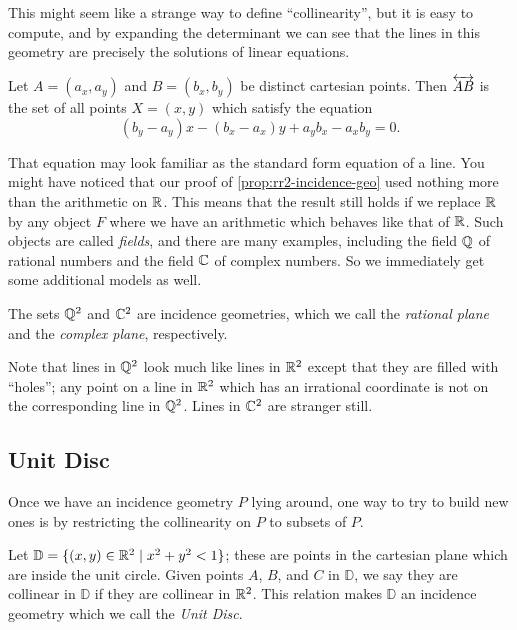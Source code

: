 This might seem like a strange way to define ``collinearity'', but it is easy to compute, and by expanding the determinant we can see that the lines in this geometry are precisely the solutions of linear equations.

\begin{cor}[Lines in \(\RR^2\)] \label{cor:cartesian-lines}
Let \(A = (a_x, a_y)\) and \(B = (b_x, b_y)\) be distinct cartesian points.
Then \(\overleftrightarrow{AB}\) is the set of all points \(X = (x,y)\) which satisfy the equation \[ (b_y-a_y)x - (b_x-a_x)y + a_yb_x - a_xb_y = 0. \]
\end{cor}

That equation may look familiar as the standard form equation of a line.
You might have noticed that our proof of \ref{prop:rr2-incidence-geo} used nothing more than the arithmetic on \(\mathbb{R}\).
This means that the result still holds if we replace \(\mathbb{R}\) by any object \(F\) where we have an arithmetic which behaves like that of \(\mathbb{R}\).
Such objects are called \emph{fields}, and there are many examples, including the field \(\mathbb{Q}\) of rational numbers and the field \(\mathbb{C}\) of complex numbers.
So we immediately get some additional models as well.

\begin{cor}
The sets \(\mathbb{Q}^2\) and \(\mathbb{C}^2\) are incidence geometries, which we call the \emph{rational plane} and the \emph{complex plane}, respectively.
\end{cor}

Note that lines in \(\mathbb{Q}^2\) look much like lines in \(\RR^2\) except that they are filled with ``holes''; any point on a line in \(\RR^2\) which has an irrational coordinate is not on the corresponding line in \(\mathbb{Q}^2\).
Lines in \(\mathbb{C}^2\) are stranger still.


\subsection{Unit Disc}

Once we have an incidence geometry \(P\) lying around, one way to try to build new ones is by restricting the collinearity on \(P\) to subsets of \(P\).

\begin{prop}
Let \(\mathbb{D} = \{ (x,y) \in \mathbb{R}^2 \mid x^2 + y^2 < 1 \}\); these are points in the cartesian plane which are inside the unit circle.
Given points \(A\), \(B\), and \(C\) in \(\mathbb{D}\), we say they are collinear in \(\mathbb{D}\) if they are collinear in \(\RR^2\).
This relation makes \(\mathbb{D}\) an incidence geometry which we call the \emph{Unit Disc}.
\end{prop}

